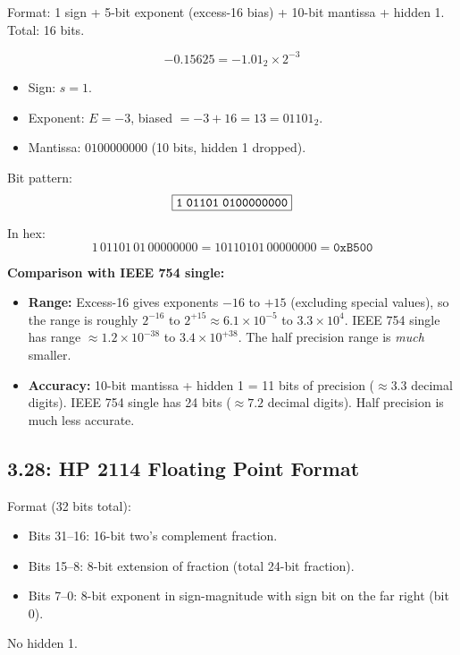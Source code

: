 Format: 1 sign + 5-bit exponent (excess-16 bias) + 10-bit mantissa + hidden 1.
Total: 16 bits.

\[
  -0.15625 = -1.01_2 \times 2^{-3}
\]

\begin{itemize}
  \item Sign: $s = 1$.
  \item Exponent: $E = -3$, biased $= -3 + 16 = 13 = 01101_2$.
  \item Mantissa: $0100000000$ (10 bits, hidden 1 dropped).
\end{itemize}

Bit pattern:
\[
  \boxed{\texttt{1\;01101\;0100000000}}
\]

In hex:
\[
  1\,01101\,01\,00000000 = 10110101\,00000000 = \boxed{\texttt{0xB500}}
\]

\medskip\noindent\textbf{Comparison with IEEE 754 single:}
\begin{itemize}
  \item \textbf{Range:} Excess-16 gives exponents $-16$ to $+15$ (excluding
        special values), so the range is roughly $2^{-16}$ to $2^{+15} \approx
        6.1 \times 10^{-5}$ to $3.3 \times 10^{4}$. IEEE 754 single has range
        $\approx 1.2 \times 10^{-38}$ to $3.4 \times 10^{+38}$.
        The half precision range is \emph{much} smaller.
  \item \textbf{Accuracy:} 10-bit mantissa + hidden 1 = 11 bits of precision
        ($\approx 3.3$ decimal digits). IEEE 754 single has 24 bits ($\approx
        7.2$ decimal digits). Half precision is much less accurate.
\end{itemize}

\subsection*{3.28: HP 2114 Floating Point Format}
\hypertarget{sol-3.28}{}

Format (32 bits total):
\begin{itemize}
  \item Bits 31--16: 16-bit two's complement fraction.
  \item Bits 15--8: 8-bit extension of fraction (total 24-bit fraction).
  \item Bits 7--0: 8-bit exponent in sign-magnitude with sign bit on the far
        right (bit 0).
\end{itemize}
No hidden 1.

